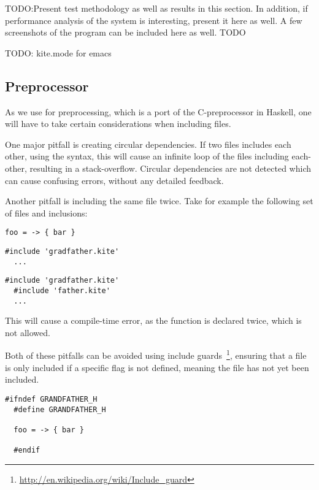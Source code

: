 
TODO:Present test methodology as well as results in this section. In addition, if performance
analysis of the system is interesting, present it here as well.
A few screenshots of the program can be included here as well. TODO

TODO: kite.mode for emacs


\subsection{Preprocessor}
As we use \cite{wallace04} for preprocessing, which is a
port of the C-preprocessor in Haskell, one will have to take certain
considerations when including files.

One major pitfall is creating circular dependencies. If two files includes
each other, using the  syntax, this will
cause an infinite loop of the files including each-other, resulting in
a stack-overflow. Circular dependencies are not detected which can
cause confusing errors, without any detailed feedback.

Another pitfall is including the same file twice. Take for example the
following set of files and inclusions:

\begin{lstlisting}[caption=\code{grandfather.kite}]
  foo = -> { bar }
\end{lstlisting}

\begin{lstlisting}[caption=\code{father.kite}]
  #include 'gradfather.kite'
  ...
\end{lstlisting}

\begin{lstlisting}[caption=\code{child.kite}]
  #include 'gradfather.kite'
  #include 'father.kite'
  ...
\end{lstlisting}

This will cause a compile-time error, as the  function is
declared twice, which is not allowed.

Both of these pitfalls can be avoided using include
guards~\footnote{\url{http://en.wikipedia.org/wiki/Include_guard}},
ensuring that a file is only included if a specific flag is not
defined, meaning the file has not yet been included.

\begin{lstlisting}[caption=\code{grandfather.kite}]
  #ifndef GRANDFATHER_H
  #define GRANDFATHER_H

  foo = -> { bar }

  #endif
\end{lstlisting}

